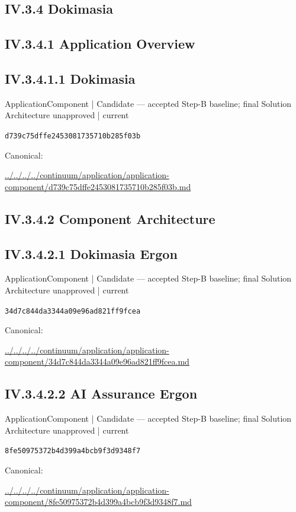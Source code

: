 \documentclass[10pt,a4paper]{article}
\begin{document}
\subsection*{IV.3.4 Dokimasia}
\subsection*{IV.3.4.1 Application Overview}
\subsection*{IV.3.4.1.1 Dokimasia}
\label{element-d739c75dffe2453081735710b285f03b}
{\small ApplicationComponent | Candidate — accepted Step-B baseline; final Solution Architecture unapproved | current}\par
\texttt{d739c75dffe2453081735710b285f03b}\par
Canonical: \par
{\footnotesize\url{../../../../continuum/application/application-component/d739c75dffe2453081735710b285f03b.md}}\par
\subsection*{IV.3.4.2 Component Architecture}
\subsection*{IV.3.4.2.1 Dokimasia Ergon}
\label{element-34d7c844da3344a09e96ad821ff9fcea}
{\small ApplicationComponent | Candidate — accepted Step-B baseline; final Solution Architecture unapproved | current}\par
\texttt{34d7c844da3344a09e96ad821ff9fcea}\par
Canonical: \par
{\footnotesize\url{../../../../continuum/application/application-component/34d7c844da3344a09e96ad821ff9fcea.md}}\par
\subsection*{IV.3.4.2.2 AI Assurance Ergon}
\label{element-8fe50975372b4d399a4bcb9f3d9348f7}
{\small ApplicationComponent | Candidate — accepted Step-B baseline; final Solution Architecture unapproved | current}\par
\texttt{8fe50975372b4d399a4bcb9f3d9348f7}\par
Canonical: \par
{\footnotesize\url{../../../../continuum/application/application-component/8fe50975372b4d399a4bcb9f3d9348f7.md}}\par
\end{document}
